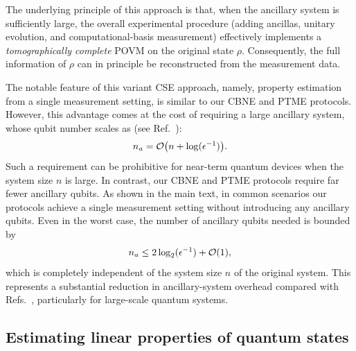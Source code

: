\documentclass[aps,prl,twocolumn,nofootinbib,superscriptaddress,10pt]{revtex4-2}
\let\originalleft\left
\let\originalright\right
\renewcommand{\left}{\mathopen{}\mathclose\bgroup\originalleft}
\renewcommand{\right}{\aftergroup\egroup\originalright}
\newcommand{\bigo}[1]{\mathcal{O}\left(#1\right)}
\theoremstyle{plain}
\theoremstyle{definition}
\begin{document}
The underlying principle of this approach is that, when the ancillary system is sufficiently large, the overall experimental procedure (adding ancillas, unitary evolution, and computational-basis measurement) effectively implements a \emph{tomographically complete} POVM on the original state $\rho$. 
Consequently, the full information of $\rho$ can in principle be reconstructed from the measurement data.


The notable feature of this variant CSE approach, namely, property estimation from a single measurement setting, is similar to our CBNE and PTME protocols. 
However, this advantage comes at the cost of requiring a large ancillary system, whose qubit number scales as (see Ref.~\cite[Theorem~1]{PhysRevLett.131.160601}): 
\begin{align}
n_a = \bigo{n+\log(\epsilon^{-1})}. 
\end{align}
Such a requirement can be prohibitive for near-term quantum devices when the system size $n$ is large.
In contrast, our CBNE and PTME protocols require far fewer ancillary qubits. 
As shown in the main text, in common scenarios our protocols achieve a single measurement setting without introducing any ancillary qubits. 
Even in the worst case, the number of ancillary qubits needed is bounded by
\begin{align}
n_a \le 2\log_2(\epsilon^{-1}) + \bigo{1},
\end{align}
which is completely independent of the system size $n$ of the original system. 
This represents a substantial reduction in ancillary-system overhead compared with Refs.~\cite{PhysRevX.13.011049,PhysRevLett.131.160601}, particularly for large-scale quantum systems.






\subsection{Estimating linear properties of quantum states}
\end{document}

